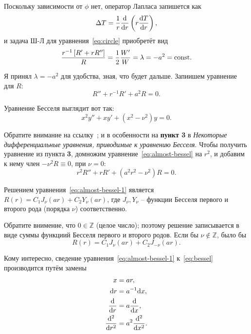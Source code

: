\documentclass[12pt]{report}
\begin{document}
Поскольку зависимости от $\phi$ нет, оператор Лапласа запишется как 
\[
\Delta T = \frac{1}{r}\frac{\mathrm d }{\mathrm d r}\left(r \frac{\mathrm d T}{\mathrm d r}\right),
\]
и задача Ш-Л для уравнения~\eqref{eq:circle} приобретёт вид
\begin{align*}
	\frac{r^{-1}\left[R' + rR''\right]}{R} = \frac12\frac{W'}{W} = \lambda = -a^2 = \mathrm{const}.
\end{align*}

Я принял $\lambda = -a^2$ для удобства, зная, что будет дальше. Запиишем уравнение для $R$:
\begin{equation}\label{eq:almost-bessel}
R'' + r^{-1}R' + a^2R = 0.
\end{equation}

Уравнение Бесселя выглядит вот так:~\cite[стр.~625]{TS:special-funcs}
\begin{equation}\label{eq:bessel}
	x^2y'' + xy' + (x^2 - \nu^2)y=0.
\end{equation}

Обратите внимание на ссылку~\cite{bessel-funcs}; и в особенности на \textbf{пункт 3} в \emph{Некоторые дифференциальные уравнения, приводимые к уравнению Бесселя}. Чтобы получить уравнение из пункта \textbf{3}, домножим уравнение~\eqref{eq:almost-bessel} на $r^2$, и добавим к нему член $-\nu^2R \equiv 0$, при $\nu=0$:
\begin{equation}\label{eq:almost-bessel-1}
	r^2R'' + rR' + (a^2r^2-\nu^2)R = 0.
\end{equation}

Решением уравнения~\eqref{eq:almost-bessel-1} является $R(r) = C_1J_\nu(ar) + C_2Y_\nu(ar)$, где $J_\nu, Y_\nu$ -- функции Бесселя первого и второго рода (порядка $\nu$) соответственно.

\begin{rmk}
	Обратите внимение, что $0\in\mathbb{Z}$ (целое число); поэтому решение записывается в виде суммы функциий Бесселя первого и второго родов. Если бы $\nu\notin\mathbb{Z}$, было бы
	\[
	R(r) = C_1J_\nu(ar) + C_2J_{-\nu}(ar).
	\]
\end{rmk}

\begin{rmk}
	Кому интересно, сведение уравнения~\eqref{eq:almost-bessel-1} к~\eqref{eq:bessel} производится путём замены
	\begin{align*}
		x &= ar, \\
		\mathrm d r &= a^{-1}\mathrm d x, \\
		\frac{\mathrm d}{\mathrm d r} &= a\frac{\mathrm d}{\mathrm d x},\\
		\frac{\mathrm d^2}{\mathrm d r^2}&= a^2\frac{\mathrm d^2}{\mathrm d x^2}.
	\end{align*}
\end{rmk}
\end{document}
